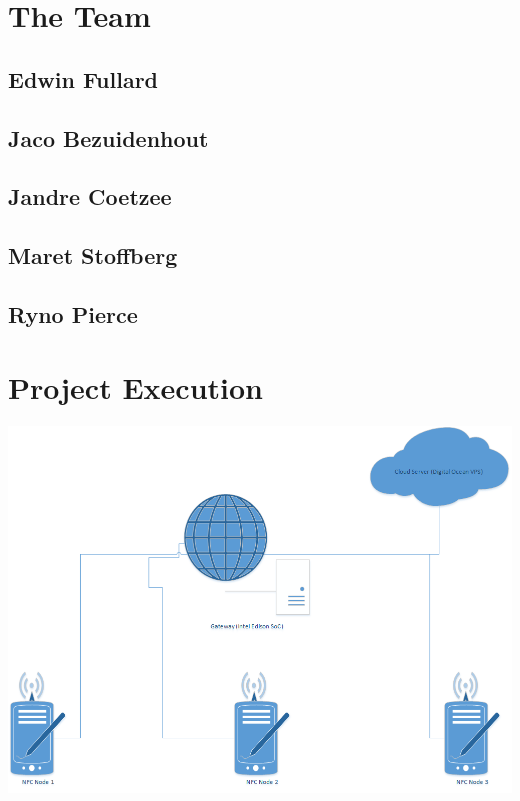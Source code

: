 \documentclass[a4paper,12pt,titlepage]{article}
\begin{document}
	
	
	\newpage
	\tableofcontents
	\newpage
	
	\section{The Team}
	
		\subsection{Edwin Fullard}
		
		\newpage
		
		\subsection{Jaco Bezuidenhout}
		
		\newpage
		
		\subsection{Jandre Coetzee}
		
		\newpage
		
		\subsection{Maret Stoffberg}
		
		\newpage
		
		\subsection{Ryno Pierce}
		
		\newpage
		

	\section{Project Execution}
		\includegraphics[scale=0.5]{./Images/Concept.png}
	
\end{document}
